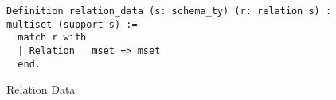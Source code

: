 \begin{figure}
\begin{center}
\begin{lstlisting}
Definition relation_data (s: schema_ty) (r: relation s) : multiset (support s) :=
  match r with
  | Relation _ mset => mset
  end.
\end{lstlisting}
\end{center}
\caption{Relation Data}
\label{fig-relationdata}
\end{figure}
